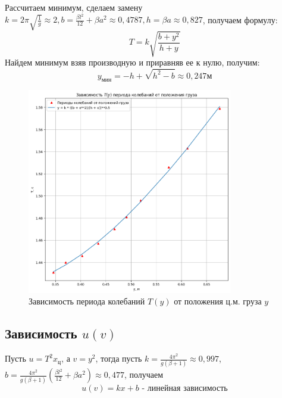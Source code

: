 \documentclass[a4paper]{article}
\begin{document}
Рассчитаем минимум, сделаем замену $k = 2\pi\sqrt{\frac{1}{g}} \approx 2, b = \frac{\beta l^2}{12} + \beta a^2 \approx 0,4787, h = \beta a \approx 0,827$, получаем формулу:
\[T = k\sqrt{\frac{b + y^2}{h + y}}\]
Найдем минимум взяв производную и приравняв ее к нулю, получим:
\[y_{\text{мин}} = -h + \sqrt{h^2 - b} \approx 0,247 м\]

\begin{figure}[t]
    \centering
    \includegraphics[width=0.8\textwidth]{graphic}
    \caption{Зависимость периода колебаний $T(y)$ от положения ц.м. груза $y$}
\end{figure}

\subsection{Зависимость $u(v)$}

Пусть $u = T^2 x_{\text{ц}}$, а $v = y^2$, тогда пусть $k = \frac{4\pi^2}{g \left( \beta + 1\right)} \approx 0,997$, $b = \frac{4\pi^2}{g \left( \beta + 1\right)} \left( \frac{\beta l^2}{12} + \beta a^2 \right) \approx 0,477$, получаем 
\[u(v) = kx + b \text{ - линейная зависимость}\]
\end{document}
